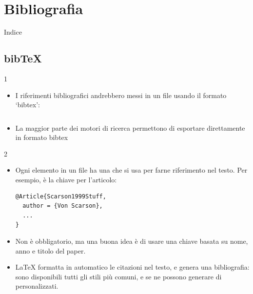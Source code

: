\documentclass{beamer}
\begin{document}
\section{Bibliografia}

\begin{frame}{Indice}
\begin{multicols}{2}
\tableofcontents[currentsection]
\end{multicols}
\end{frame}

\subsection{bib\TeX}
\begin{frame}[fragile]{\insertsubsection{} 1}
\begin{itemize}
\item I riferimenti bibliografici andrebbero messi in un file 
usando il formato `bibtex':
\inputminted[fontsize=\scriptsize,frame=single]{latex}{bib-example.bib}
\item La maggior parte dei motori di ricerca permettono di esportare
direttamente in formato bibtex
\end{itemize}
\end{frame}

\begin{frame}[fragile]{\insertsubsection{} 2}
\begin{itemize}
\item Ogni elemento in un file  ha una  che si usa per farne riferimento nel testo. Per esempio,  \`e la chiave per l'articolo:
\begin{verbatim}
@Article{Scarson1999Stuff,
  author = {Von Scarson},
  ...
}
\end{verbatim}
\item Non \`e obbligatorio, ma una buona idea \`e di usare una chiave basata su
nome, anno e titolo del paper.
\item \LaTeX{} formatta in automatico le citazioni nel testo, e genera una bibliografia: sono disponibili tutti gli stili pi\`u comuni, e se ne possono generare di personalizzati.
\end{itemize}
\end{frame}
\end{document}
